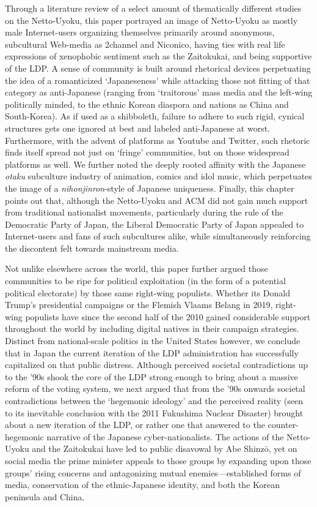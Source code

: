 \documentclass[10pt,british,A4paper,twoside]{memoir}
\begin{document}
Through a literature review of a select amount of thematically different
studies on the Netto-Uyoku, this paper portrayed an image of Netto-Uyoku
as mostly male Internet-users organizing themselves primarily around
anonymous, subcultural Web-media as 2channel and Niconico, having ties
with real life expressions of xenophobic sentiment such as the
Zaitokukai, and being supportive of the LDP. A sense of community is
built around rhetorical devices perpetuating the idea of a romanticized
`Japaneseness' while attacking those not fitting of that category as
anti-Japanese (ranging from `traitorous' mass media and the left-wing
politically minded, to the ethnic Korean diaspora and nations as China
and South-Korea). As if used as a shibboleth, failure to adhere to such
rigid, cynical structures gets one ignored at best and labeled
anti-Japanese at worst. Furthermore, with the advent of platforms as
Youtube and Twitter, such rhetoric finds itself spread not just on
`fringe' communities, but on those widespread platforms as well. We
further noted the deeply rooted affinity with the Japanese \emph{otaku}
subculture industry of animation, comics and idol music, which
perpetuates the image of a \emph{nihonjinron}-style of Japanese
uniqueness. Finally, this chapter points out that, although the Netto-Uyoku and ACM did not gain much support from traditional nationalist movements, particularly during the rule of the Democratic Party of Japan, the Liberal Democratic
Party of Japan appealed to Internet-users and fans of such subcultures alike,
while simultaneously reinforcing the discontent felt towards mainstream media.

Not unlike elsewhere across the world, this paper further argued those
communities to be ripe for political exploitation (in the form of a
potential political electorate) by those same right-wing populists.
Whether its Donald Trump's presidential campaigns or the Flemish Vlaams Belang in 2019,
right-wing populists have since the second half of the 2010 gained
considerable support throughout the world by including digital natives
in their campaign strategies. Distinct from national-scale politics in
the United States however, we conclude that in Japan the current
iteration of the LDP administration has successfully capitalized on that
public distress. Although perceived societal contradictions up to the
'90s shook the core of the LDP strong enough to bring about a massive
reform of the voting system, we next argued that from the '90s onwards
societal contradictions between the `hegemonic ideology' and the
perceived reality (seen to its inevitable conclusion with the 2011
Fukushima Nuclear Disaster) brought about a new iteration of the LDP, or
rather one that answered to the counter-hegemonic narrative of the
Japanese cyber-nationalists. The actions of the Netto-Uyoku and the
Zaitokukai have led to public disavowal by Abe Shinzō, yet on
social media the prime minister appeals to those groups by expanding
upon those groups' rising concerns and antagonizing mutual enemies---established forms of media, conservation of the ethnic-Japanese
identity, and both the Korean peninsula and
China.
\end{document}
